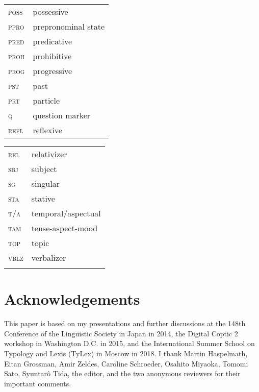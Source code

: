 \documentclass[output=paper,colorlinks,citecolor=brown ,chinesefont]{langscibook}
\begin{document}
\begin{tabularx}{.45\textwidth}{lQ}
\textsc{poss}& possessive\\
\textsc{ppro} & prepronominal state\\
\textsc{pred}& predicative\\
\textsc{proh}& prohibitive\\
\textsc{prog}& progressive\\
\textsc{pst}& past\\
\textsc{prt}& particle\\
\textsc{q}& question marker\\
\textsc{refl}& reflexive\\
\end{tabularx}
\begin{tabularx}{.45\textwidth}{lQ}
\textsc{rel}& relativizer\\
\textsc{sbj}& subject\\
\textsc{sg}& singular\\
\textsc{sta}& stative\\
\textsc{t/a}& temporal/aspectual\\
\textsc{tam}& tense-aspect-mood\\
\textsc{top}& topic\\
\textsc{vblz}& verbalizer\\
\\
\end{tabularx}%

\section*{Acknowledgements}
This paper is based on my presentations and further discussions at the 148th Conference of the Linguistic Society in Japan in 2014, the Digital Coptic 2 workshop in Washington D.C. in 2015, and the International Summer School on Typology and Lexis (TyLex) in Moscow in 2018. I thank Martin Haspelmath, Eitan Grossman, Amir Zeldes, Caroline Schroeder, Osahito Miyaoka, Tomomi Sato, Syuntarô Tida, the editor, and the two anonymous reviewers for their important comments.

\sloppy
\printbibliography[heading=subbibliography,notkeyword=this]
\end{document}
